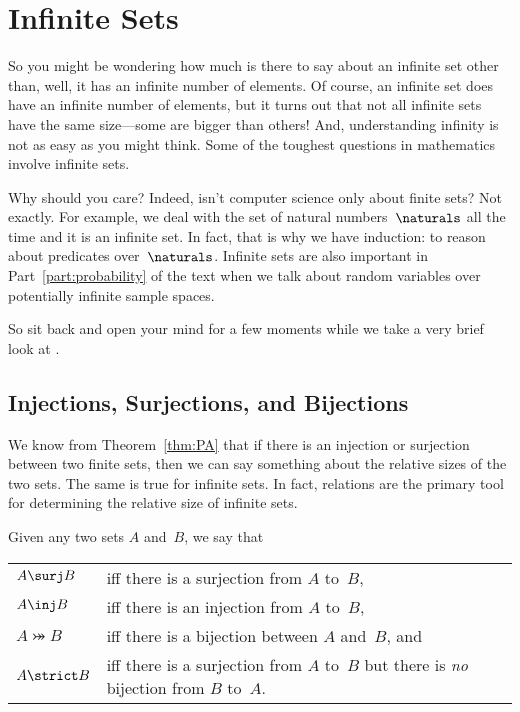 \chapter{Infinite Sets}\label{cardinality_chap}

So you might be wondering how much is there to say about an infinite
set other than, well, it has an infinite number of elements.  Of
course, an infinite set does have an infinite number of elements, but
it turns out that not all infinite sets have the same size---some are
bigger than others!  And, understanding infinity is not as easy as you
might think.  Some of the toughest questions in mathematics involve
infinite sets.

Why should you care?  Indeed, isn't computer science only about finite
sets?  Not exactly.  For example, we deal with the set of natural
numbers~$\naturals$ all the time and it is an infinite set.  In fact,
that is why we have induction: to reason about predicates
over~$\naturals$.  Infinite sets are also important in
Part~\ref{part:probability} of the text when we talk about random
variables over potentially infinite sample spaces.

So sit back and open your mind for a few moments while we take a very
brief look at .

\section{Injections, Surjections, and Bijections}

We know from Theorem~\ref{thm:PA} that if there is an injection or
surjection between two finite sets, then we can say something about
the relative sizes of the two sets.  The same is true for infinite
sets.  In fact, relations are the primary tool for determining the
relative size of infinite sets.

\begin{definition}
Given any two sets $A$ and~$B$, we say that
\begin{center}
\begin{tabular}{lp{3in}}
$A \surj B$     & iff there is a surjection from $A$ to~$B$, \\

$A \inj B$      & iff there is an injection from $A$ to~$B$, \\

$A \bij B$      & iff there is a bijection between $A$ and~$B$, and \\

$A \strict B$   & iff there is a surjection from $A$ to~$B$ but
  there is \emph{no} bijection from $B$ to~$A$.
\end{tabular}
\end{center}
\end{definition}


